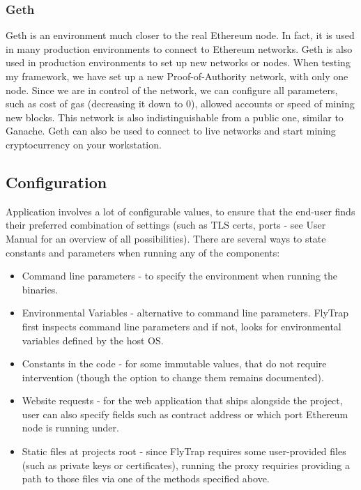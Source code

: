 \subsubsection{Geth}
Geth is an environment much closer to the real Ethereum node. In fact, it is used in many production environments to connect to Ethereum networks. Geth is also used in production environments to set up new networks or nodes. When testing my framework, we have set up a new Proof-of-Authority network, with only one node. Since we are in control of the network, we can configure all parameters, such as cost of gas (decreasing it down to 0), allowed accounts or speed of mining new blocks. This network is also indistinguishable from a public one, similar to Ganache. Geth can also be used to connect to live networks and start mining cryptocurrency on your workstation.

\subsection{Configuration}
Application involves a lot of configurable values, to ensure that the end-user finds their preferred combination of settings (such as TLS certs, ports - see User Manual for an overview of all possibilities). There are several ways to state constants and parameters when running any of the components:
\begin{itemize}
    \item Command line parameters - to specify the environment when running the binaries.
    \item Environmental Variables - alternative to command line parameters. FlyTrap first inspects command line parameters and if not, looks for environmental variables defined by the host OS.
    \item Constants in the code - for some immutable values, that do not require intervention (though the option to change them remains documented).
    \item Website requests - for the web application that ships alongside the project, user can also specify fields such as contract address or which port Ethereum node is running under.
    \item Static files at projects root - since FlyTrap requires some user-provided files (such as private keys or certificates), running the proxy requiries providing a path to those files via one of the methods specified above.
\end{itemize}
